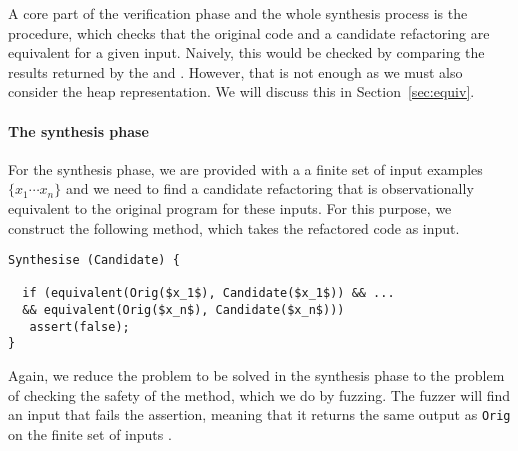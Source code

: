 \documentclass[runningheads,a4paper]{llncs}
\begin{document}
A core part of the verification phase and the whole synthesis process
is the  procedure, which checks that the original code
and a candidate refactoring are equivalent for a given input.
Naively, this would be checked by comparing the results returned by the
 and . However, that is not enough as
we must also consider the heap representation. We will discuss this in
Section~\ref{sec:equiv}.




\paragraph{The synthesis phase} For the synthesis phase, we are provided with a
a finite set of input examples $\{x_1 \cdots x_n\}$ and we need to find a candidate refactoring
that is observationally equivalent to the original program for these inputs.
For this purpose, we construct the following  method, which
takes the refactored code  as input.

\begin{lstlisting}[mathescape=true,showstringspaces=false]
Synthesise (Candidate) {

  if (equivalent(Orig($x_1$), Candidate($x_1$)) && ...
  && equivalent(Orig($x_n$), Candidate($x_n$)))
   assert(false);
}
\end{lstlisting}

Again, we reduce the problem to be solved in the synthesis phase to
the problem of checking the safety of the  method,
which we do by fuzzing.
The fuzzer will find an input  that fails the assertion,
meaning that it returns the same output as \texttt{Orig}
on the finite set of inputs .



\end{document}
